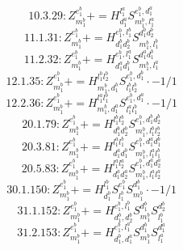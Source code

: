 \documentclass[letterpaper,10pt,fleqn,leqno,onecolumn]{article}
\begin{document}
\begin{equation} \;\;\;\;\;\;  10.3.29: Z^{e_{1}^{b}}_{m_{1}^{b}}+=H^{l_{1}^{a}}_{d_{1}^{a}}S^{e_{1}^{b},d_{1}^{a}}_{m_{1}^{b},l_{1}^{a}} \end{equation}
\begin{equation} \;\;\;\;\;\;  11.1.31: Z^{e_{1}^{b}}_{m_{1}^{b}}+=H^{e_{1}^{b},l_{1}^{b}}_{d_{1}^{b}d_{2}^{b}}S^{d_{1}^{b}d_{2}^{b}}_{m_{1}^{b},l_{1}^{b}} \end{equation}
\begin{equation} \;\;\;\;\;\;  11.2.32: Z^{e_{1}^{b}}_{m_{1}^{b}}+=H^{e_{1}^{b},l_{1}^{a}}_{d_{1}^{a}d_{1}^{b}}S^{d_{1}^{a}d_{1}^{b}}_{m_{1}^{b},l_{1}^{a}} \end{equation}
\begin{equation} \;\;\;\;\;\;  12.1.35: Z^{e_{1}^{b}}_{m_{1}^{b}}+=H^{l_{1}^{b}l_{2}^{b}}_{m_{1}^{b},d_{1}^{b}}S^{e_{1}^{b},d_{1}^{b}}_{l_{1}^{b}l_{2}^{b}}\cdot -1/1 \end{equation}
\begin{equation} \;\;\;\;\;\;  12.2.36: Z^{e_{1}^{b}}_{m_{1}^{b}}+=H^{l_{1}^{a}l_{1}^{b}}_{m_{1}^{b},d_{1}^{a}}S^{e_{1}^{b},d_{1}^{a}}_{l_{1}^{a}l_{1}^{b}}\cdot -1/1 \end{equation}
\begin{equation} \;\;\;\;\;\;  20.1.79: Z^{e_{1}^{b}}_{m_{1}^{b}}+=H^{l_{1}^{b}l_{2}^{b}}_{d_{1}^{b}d_{2}^{b}}S^{e_{1}^{b},d_{1}^{b}d_{2}^{b}}_{m_{1}^{b},l_{1}^{b}l_{2}^{b}} \end{equation}
\begin{equation} \;\;\;\;\;\;  20.3.81: Z^{e_{1}^{b}}_{m_{1}^{b}}+=H^{l_{1}^{a}l_{1}^{b}}_{d_{1}^{a}d_{1}^{b}}S^{e_{1}^{b},d_{1}^{a}d_{1}^{b}}_{m_{1}^{b},l_{1}^{a}l_{1}^{b}} \end{equation}
\begin{equation} \;\;\;\;\;\;  20.5.83: Z^{e_{1}^{b}}_{m_{1}^{b}}+=H^{l_{1}^{a}l_{2}^{a}}_{d_{1}^{a}d_{2}^{a}}S^{e_{1}^{b},d_{1}^{a}d_{2}^{a}}_{m_{1}^{b},l_{1}^{a}l_{2}^{a}} \end{equation}
\begin{equation} \;\;\;\;\;\;  30.1.150: Z^{e_{1}^{b}}_{m_{1}^{b}}+=H^{l_{1}^{b}}_{d_{1}^{b}}S^{e_{1}^{b}}_{l_{1}^{b}}S^{d_{1}^{b}}_{m_{1}^{b}}\cdot -1/1 \end{equation}
\begin{equation} \;\;\;\;\;\;  31.1.152: Z^{e_{1}^{b}}_{m_{1}^{b}}+=H^{e_{1}^{b},l_{1}^{b}}_{d_{1}^{b},d_{2}^{b}}S^{d_{1}^{b}}_{m_{1}^{b}}S^{d_{2}^{b}}_{l_{1}^{b}} \end{equation}
\begin{equation} \;\;\;\;\;\;  31.2.153: Z^{e_{1}^{b}}_{m_{1}^{b}}+=H^{e_{1}^{b},l_{1}^{a}}_{d_{1}^{b},d_{1}^{a}}S^{d_{1}^{b}}_{m_{1}^{b}}S^{d_{1}^{a}}_{l_{1}^{a}} \end{equation}
\end{document}
